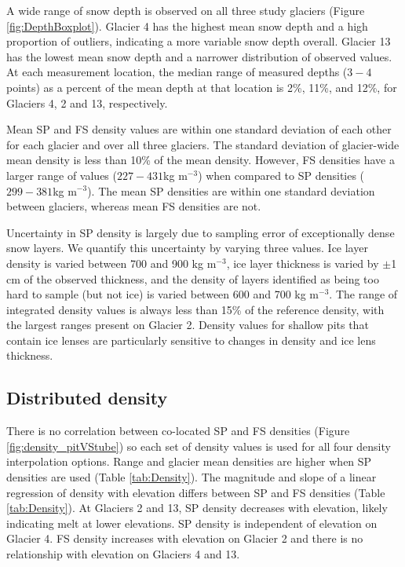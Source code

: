 \documentclass[review,oneside, letterpaper]{igs}
\begin{document}
A wide range of snow depth is observed on all three study glaciers (Figure \ref{fig:DepthBoxplot}). Glacier 4 has the highest mean snow depth and a high proportion of outliers, indicating a more variable snow depth overall. Glacier 13 has the lowest mean snow depth and a narrower distribution of observed values. At each measurement location, the median range of measured depths ($3-4$ points) as a percent of the mean depth at that location is 2\%, 11\%, and 12\%, for Glaciers 4, 2 and 13, respectively. 

Mean SP and FS density values are within one standard deviation of each other for each glacier and over all three glaciers. The standard deviation of glacier-wide mean density is less than 10\% of the mean density. However, FS densities have a larger range of values ($227-431$kg m$^{-3}$) when compared to SP densities ($299-381$kg m$^{-3}$).  The mean SP densities are within one standard deviation between glaciers, whereas mean FS densities are not.

Uncertainty in SP density is largely due to sampling error of exceptionally dense snow layers. We quantify this uncertainty by varying three values. Ice layer density is varied between 700 and 900 kg m$^{-3}$, ice layer thickness is varied by $\pm$1 cm of the observed thickness, and the density of layers identified as being too hard to sample (but not ice) is varied between 600 and 700 kg m$^{-3}$. The range of integrated density values is always less than 15\% of the reference density, with the largest ranges present on Glacier 2. Density values for shallow pits that contain ice lenses are particularly sensitive to changes in density and ice lens thickness.

\subsection{Distributed density}

There is no correlation between co-located SP and FS densities (Figure \ref{fig:density_pitVStube}) so each set of density values is used for all four density interpolation options. Range and glacier mean densities are higher when SP densities are used (Table \ref{tab:Density}). The magnitude and slope of a linear regression of density with elevation differs between SP and FS densities (Table \ref{tab:Density}). At Glaciers 2 and 13, SP density decreases with elevation, likely indicating melt at lower elevations. SP density is independent of elevation on Glacier 4. FS density increases with elevation on Glacier 2 and there is no relationship with elevation on Glaciers 4 and 13. 
\end{document}
